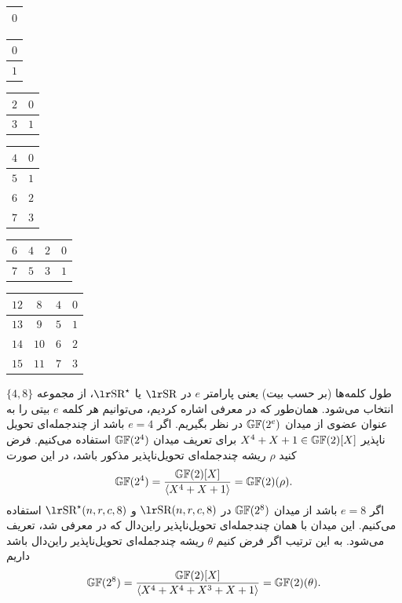 \begin{center}
	\begin{tabular}{|c|}
		\hline 
		$0$ \\ 
		\hline 
	\end{tabular} 
	\quad
	\begin{tabular}{|c|}
		\hline 
		$0$ \\ 
		\hline 
		$1$ \\ 
		\hline 
	\end{tabular} 
	\quad
	\begin{tabular}{|c|c|}
		\hline 
		$2$ & $0$ \\ 
		\hline 
		$3$ & $1$ \\ 
		\hline 
	\end{tabular}
	\quad
	\begin{tabular}{|c|c|}
		\hline 
		$4$ & $0$ \\ 
		\hline 
		$5$ & $1$ \\ 
		\hline 
		$6$ & $2$ \\ 
		\hline 
		$7$ & $3$ \\ 
		\hline 
	\end{tabular} 
	\quad
	\begin{tabular}{|c|c|c|c|}
		\hline 
		$6$ & $4$ & $2$ & $0$ \\ 
		\hline 
		$7$ & $5$ & $3$ & $1$ \\ 
		\hline 
	\end{tabular} 
	\quad
	\begin{tabular}{|c|c|c|c|}
		\hline 
		$12$ & $8$ & $4$ & $0$ \\ 
		\hline 
		$13$ & $9$ & $5$ & $1$ \\ 
		\hline 
		$14$ & $10$ & $6$ & $2$ \\ 
		\hline 
		$15$ & $11$ & $7$ & $3$ \\ 
		\hline 
	\end{tabular} 
\end{center}


طول کلمه‌ها (بر حسب بیت) یعنی پارامتر 
$e$
در 
$\text{\en{SR}}$
یا 
$\text{\en{SR}}^{\star}$، 
از مجموعه‌ 
$\{4,8\}$
انتخاب می‌شود. همان‌طور که در معرفی 
اشاره کردیم، می‌توانیم هر کلمه 
$e$
بیتی را به عنوان عضوی از میدان 
$\mathbb{GF}(2^{e})$
در نظر بگیریم. اگر 
$e = 4$
باشد از چندجمله‌ای تحویل ناپذیر 
$X^{4} + X + 1\in\mathbb{GF}(2)[X]$
برای تعریف میدان 
$\mathbb{GF}(2^{4})$
 استفاده می‌کنیم. فرض کنید 
$\rho$
ریشه چندجمله‌ای تحویل‌ناپذیر مذکور باشد، در این صورت 
$$\mathbb{GF}(2^{4}) = \frac{\mathbb{GF}(2)[X]}{\langle X^{4} + X + 1 \rangle} = \mathbb{GF}(2)(\rho).$$
اگر 
$e = 8$
باشد از میدان 
$\mathbb{GF}(2^{8})$
در 
$\text{\en{SR}}(n,r,c,8)$
و
$\text{\en{SR}}^{\star}(n,r,c,8)$
استفاده می‌کنیم. این میدان با همان چندجمله‌ای تحویل‌ناپذیر راین‌دال که در 
معرفی شد، تعریف می‌شود.  به این ترتیب اگر فرض کنیم 
$\theta$
ریشه چندجمله‌ای تحویل‌ناپذیر راین‌دال باشد داریم
$$\mathbb{GF}(2^{8}) = \frac{\mathbb{GF}(2)[X]}{\langle X^{4} + X^{4} + X^{3} + X + 1\rangle} = \mathbb{GF}(2)(\theta).$$


